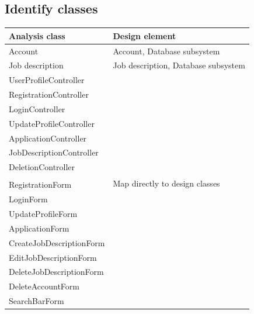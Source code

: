 \documentclass[a4paper]{article}
\begin{document}
    \subsection{Identify classes}
    \begin{center}
        \begin{tabular} { | l | l | }
            \hline
            \textbf{Analysis class} & \textbf{Design element} \\
            \hline
            Account & Account, Database subsystem \\
            \hline
            Job description & Job description, Database subsystem \\
            \hline
            UserProfileController & \multirow{16}{*}{Map directly to design classes} \\
            \cline{1-1}
            RegistrationController & \\
            \cline{1-1}
            LoginController & \\
            \cline{1-1}
            UpdateProfileController & \\
            \cline{1-1}
            ApplicationController & \\
            \cline{1-1}
            JobDescriptionController & \\
            \cline{1-1}
            DeletionController & \\
            \cline{1-1} & \\
            RegistrationForm & \\
            \cline{1-1}
            LoginForm & \\
            \cline{1-1}
            UpdateProfileForm & \\
            \cline{1-1}
            ApplicationForm & \\
            \cline{1-1}
            CreateJobDescriptionForm & \\
            \cline{1-1}
            EditJobDescriptionForm & \\
            \cline{1-1}
            DeleteJobDescriptionForm & \\
            \cline{1-1}
            DeleteAccountForm & \\
            \cline{1-1}
            SearchBarForm & \\
            \hline
            
        \end{tabular}
    \end{center}
\end{document}
